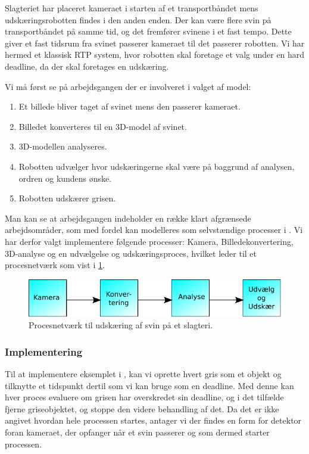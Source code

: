 Slagteriet har placeret kameraet i starten af et transportbåndet mens udskæringsrobotten findes i den anden enden. Der kan være flere svin på transportbåndet på samme tid, og det fremfører svinene i et fast tempo. Dette giver et fast tidsrum fra svinet passerer kameraet til det passerer robotten. Vi har hermed et klassisk RTP system, hvor robotten skal foretage et valg under en hard deadline, da der skal foretages en udskæring.

Vi må først se på arbejdsgangen der er involveret i valget af model:
\begin{enumerate}
\tightlist
	\item Et billede bliver taget af svinet mens den passerer kameraet.
	\item Billedet konverteres til en 3D-model af svinet.
	\item 3D-modellen analyseres.
	\item Robotten udvælger hvor udskæringerne skal være på baggrund af analysen, ordren og kundens ønske.
	\item Robotten udskærer grisen.
\end{enumerate}

Man kan se at arbejdsgangen indeholder en  række klart afgrænsede arbejdsområder, som med fordel kan modelleres som selvstændige processer i \pycsp.  Vi har derfor valgt implementere følgende processer: Kamera, Billedekonvertering, 3D-analyse og en udvælgelse og udskæringsproces, hvilket leder til et procesnetværk som vist i \cref{fig:pig-network}.

\begin{figure}
 \begin{center}
  \includegraphics[scale=1]{images/pig-network}
	\caption{Procesnetværk til udskæring af svin på et slagteri.}
	\label{fig:pig-network}
\end{center}
\end{figure}

\subsubsection*{Implementering}\label{sec:deadline-exampel-implementation}
Til at implementere eksemplet i \pycsp, kan vi oprette hvert gris som et objekt og tilknytte et tidspunkt dertil som vi kan bruge som en deadline. Med denne kan hver proces evaluere om grisen har overskredet sin deadline, og i det tilfælde fjerne griseobjektet, og stoppe den videre behandling af det. Da det er ikke angivet hvordan hele processen startes,  antager vi der findes en form for detektor foran kameraet, der opfanger når et svin passerer og som dermed starter processen. 

